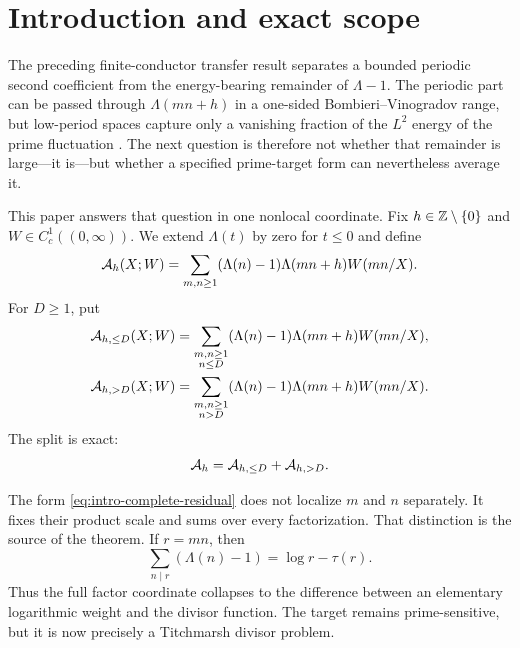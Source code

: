 \section{Introduction and exact scope}
\label{sec:introduction}

The preceding finite-conductor transfer result separates a bounded periodic
second coefficient from the energy-bearing remainder of $\Lambda-1$.  The
periodic part can be passed through $\Lambda(mn+h)$ in a one-sided
Bombieri--Vinogradov range, but low-period spaces capture only a vanishing
fraction of the $L^2$ energy of the prime fluctuation
\citep{WangTPCSeven2026,WangTPCEight2026}.  The next question is therefore
not whether that remainder is large---it is---but whether a specified
prime-target form can nevertheless average it.

This paper answers that question in one nonlocal coordinate.  Fix
$h\in\mathbb Z\setminus\{0\}$ and $W\in C_c^1((0,\infty))$.  We extend
$\Lambda(t)$ by zero for $t\leq0$ and define
\begin{equation}\label{eq:intro-complete-residual}
 \mathcal A_h(X;W)
 =\sum_{m,n\geq1}
   (\Lambda(n)-1)\Lambda(mn+h)W(mn/X).
\end{equation}
For $D\geq1$, put
\begin{align}
 \mathcal A_{h,\leq D}(X;W)
 &=\sum_{\substack{m,n\geq1\\n\leq D}}
   (\Lambda(n)-1)\Lambda(mn+h)W(mn/X),
 \label{eq:intro-small-residual}\\
 \mathcal A_{h,>D}(X;W)
 &=\sum_{\substack{m,n\geq1\\n>D}}
   (\Lambda(n)-1)\Lambda(mn+h)W(mn/X).
 \label{eq:intro-large-residual}
\end{align}
The split is exact:
\begin{equation}\label{eq:intro-exact-split}
 \mathcal A_h=\mathcal A_{h,\leq D}+\mathcal A_{h,>D}.
\end{equation}

The form \eqref{eq:intro-complete-residual} does not localize $m$ and $n$
separately.  It fixes their product scale and sums over every factorization.
That distinction is the source of the theorem.  If $r=mn$, then
\begin{equation}\label{eq:intro-zero-mode-collapse}
 \sum_{n\mid r}(\Lambda(n)-1)
 =\log r-\tau(r).
\end{equation}
Thus the full factor coordinate collapses to the difference between an
elementary logarithmic weight and the divisor function.  The target remains
prime-sensitive, but it is now precisely a Titchmarsh divisor problem.

